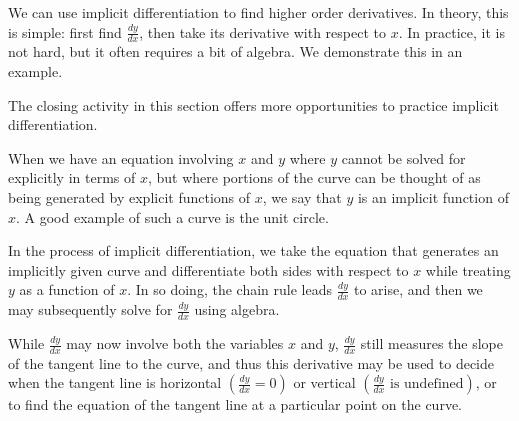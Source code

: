 We can use implicit differentiation to find higher order derivatives. In theory, this is simple: first find $\frac{dy}{dx}$, then take its derivative with respect to $x$. In practice, it is not hard, but it often requires a bit of algebra. We demonstrate this in an example.


The closing activity in this section offers more opportunities to practice implicit differentiation.


\begin{summary}
\item When we have an equation involving $x$ and $y$ where $y$ cannot be solved for explicitly in terms of $x$, but where portions of the curve can be thought of as being generated by explicit functions of $x$, we say that $y$ is an implicit function of $x$.  A good example of such a curve is the unit circle.
\item In the process of implicit differentiation, we take the equation that generates an implicitly given curve and differentiate both sides with respect to $x$ while treating $y$ as a function of $x$.  In so doing, the chain rule leads $\frac{dy}{dx}$ to arise, and then we may subsequently solve for $\frac{dy}{dx}$ using algebra. 
\item While $\frac{dy}{dx}$ may now involve both the variables $x$ and $y$, $\frac{dy}{dx}$ still measures the slope of the tangent line to the curve, and thus this derivative may be used to decide when the tangent line is horizontal $\left( \frac{dy}{dx} = 0 \right)$ or vertical $\left( \frac{dy}{dx} \text{ is undefined}\right)$, or to find the equation of the tangent line at a particular point on the curve.
\end{summary}

\clearpage

 

\cleardoublepage